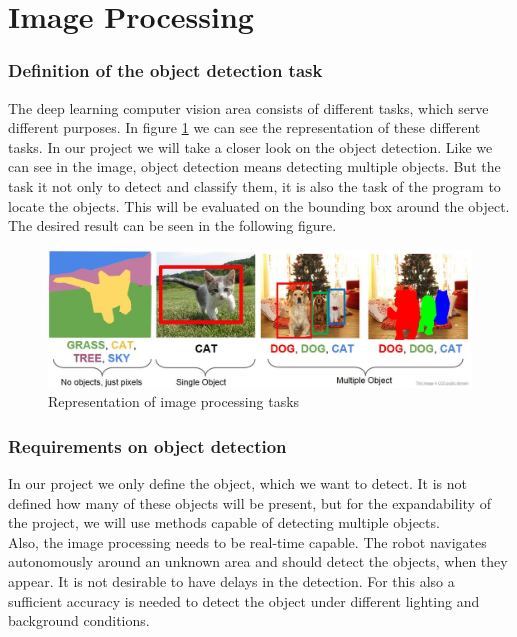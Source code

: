 \newpage

\section{Image Processing}\label{sec:image_processing}

\subsubsection{Definition of the object detection task}

The deep learning computer vision area consists of different tasks, which serve different purposes. In figure \ref{fig:object_detection} we can see the representation of these different tasks. In our project we will take a closer look on the object detection. Like we can see in the image, object detection means detecting multiple objects. But the task it not only to detect and classify them, it is also the task of the program to locate the objects. This will be evaluated on the bounding box around the object.  The desired result can be seen in the following figure.

\begin{figure}[H]
\centering
\includegraphics[width=\textwidth]{sources/object_detection.png}
\caption[Image processing task]{Representation of image processing tasks}
\label{fig:object_detection}
\end{figure}

\subsubsection{Requirements on object detection}

In our project we only define the object, which we want to detect. It is not defined how many of these objects will be present, but for the expandability of the project, we will use methods capable of detecting multiple objects.\\

Also, the image processing needs to be real-time capable. The robot navigates autonomously around an unknown area and should detect the objects, when they appear. It is not desirable to have delays in the detection. For this also a sufficient accuracy is needed to detect the object under different lighting and background conditions. \\

